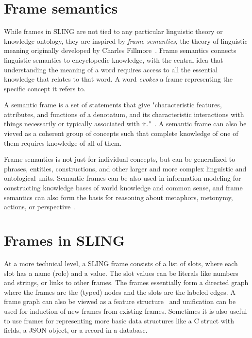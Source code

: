 \documentclass[11pt,a4paper]{article}
\begin{document}
\section{Frame semantics}
\label{sec:framesem}

While frames in SLING are not tied to any particular linguistic theory or
knowledge ontology, they are inspired by \emph{frame semantics}, the
theory of linguistic meaning originally developed by Charles Fillmore~\cite{fillmore1982}.
Frame semantics connects linguistic semantics to encyclopedic knowledge, with the
central idea that understanding the meaning of a word requires access to all
the essential knowledge that relates to that word. A word \emph{evokes} a frame
representing the specific concept it refers to.

A semantic frame is a set of statements that give "characteristic
features, attributes, and functions of a denotatum, and its characteristic
interactions with things necessarily or typically associated with it."~\cite{alan2001}.
A semantic frame can also be vieved as a coherent group of concepts
such that complete knowledge of one of them requires knowledge of all of them.

Frame semantics is not just for individual concepts, but can be generalized
to phrases, entities, constructions, and other larger and more complex linguistic
and ontological units. Semantic frames can be also used in information modeling
for constructing knowledge bases of world knowledge and common sense, and frame
semantics can also form the basis for reasoning about metaphors, metonymy,
actions, or perspective~\cite{???}.

\section{Frames in SLING}
\label{sec:slingframes}

At a more technical level, a SLING frame consists of a list of slots, where each
slot has a name (role) and a value. The slot values can be literals like numbers
and strings, or links to other frames. The frames essentially form a directed graph where
the frames are the (typed) nodes and the slots are the labeled edges. A frame
graph can also be viewed as a feature structure~\cite{carpenter2005} and
unification can be used for induction of new frames from existing frames.
Sometimes it is also useful to use frames for representing more basic data
structures like a C struct with fields, a JSON object, or a record in a
database.
\end{document}
